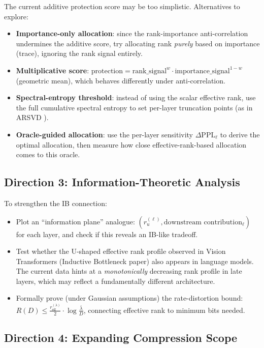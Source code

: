 \documentclass[11pt]{article}
\begin{document}
The current additive protection score may be too simplistic.  Alternatives to explore:
\begin{itemize}
    \item \textbf{Importance-only allocation}: since the rank-importance anti-correlation undermines the additive score, try allocating rank \emph{purely} based on importance (trace), ignoring the rank signal entirely.
    \item \textbf{Multiplicative score}: $\text{protection} = \text{rank\_signal}^w \cdot \text{importance\_signal}^{1-w}$ (geometric mean), which behaves differently under anti-correlation.
    \item \textbf{Spectral-entropy threshold}: instead of using the scalar effective rank, use the full cumulative spectral entropy to set per-layer truncation points (as in ARSVD \cite{cherukuri2025arsvd}).
    \item \textbf{Oracle-guided allocation}: use the per-layer sensitivity $\Delta\text{PPL}_\ell$ to derive the optimal allocation, then measure how close effective-rank-based allocation comes to this oracle.
\end{itemize}

\subsection{Direction 3: Information-Theoretic Analysis}

To strengthen the IB connection:
\begin{itemize}
    \item Plot an ``information plane'' analogue: $(r_u^{(\ell)}, \text{downstream contribution}_\ell)$ for each layer, and check if this reveals an IB-like tradeoff.
    \item Test whether the U-shaped effective rank profile observed in Vision Transformers (Inductive Bottleneck paper) also appears in language models.  The current data hints at a \emph{monotonically} decreasing rank profile in late layers, which may reflect a fundamentally different architecture.
    \item Formally prove (under Gaussian assumptions) the rate-distortion bound: $R(D) \leq \frac{r_{\text{eff}}^{(\lambda)}}{2} \cdot \log \frac{\bar{\lambda}}{D}$, connecting effective rank to minimum bits needed.
\end{itemize}

\subsection{Direction 4: Expanding Compression Scope}
\end{document}
